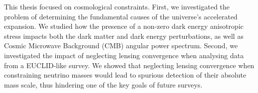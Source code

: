 \documentclass[12pt]{report}
\renewcommand{\(}{\left(}
\renewcommand{\)}{\right)}
\renewcommand{\[}{\left[}
\renewcommand{\]}{\right]}
\begin{document}
This thesis focused on cosmological constraints. First, we investigated the problem of determining the fundamental causes of the universe's accelerated expansion. We studied how the presence of a non-zero dark energy anisotropic stress impacts  both the dark matter and dark energy perturbations, as well as Cosmic Microwave Background (CMB) angular power spectrum. %
Second, we investigated the impact of neglecting lensing convergence when analysing data from a EUCLID-like survey. We showed that neglecting lensing convergence when constraining neutrino masses would lead to spurious detection of their absolute mass scale, thus hindering one of the key goals of future surveys. 
\end{document}
